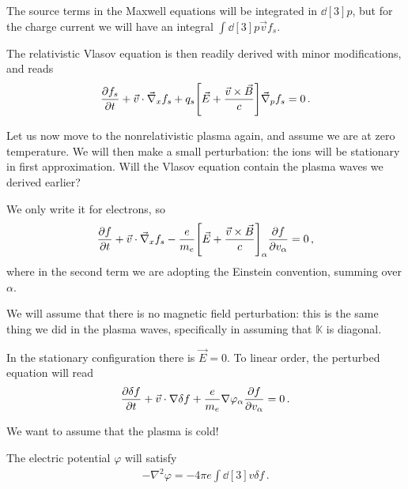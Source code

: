 \documentclass[main.tex]{subfiles}
\begin{document}
The source terms in the Maxwell equations will be integrated in \(\dd[3]{p}\), but for the charge current we will have an integral \(\int \dd[3]{p} \vec{v} f_s\). 

The relativistic Vlasov equation is then readily derived with minor modifications, and reads 
%
\begin{align}
\pdv{f_s}{t} + \vec{v} \cdot \vec{\nabla}_x f_s + q_s \qty[ \vec{E} + \frac{\vec{v} \times \vec{B}}{c}] \vec{\nabla}_p f_s = 0 
\,.
\end{align}

Let us now move to the nonrelativistic plasma again, and assume we are at zero temperature. 
We will then make a small perturbation: the ions will be stationary in first approximation. 
Will the Vlasov equation contain the plasma waves we derived earlier? 

We only write it for electrons, so 
%
\begin{align}
\pdv{f}{t} + \vec{v} \cdot \vec{\nabla}_x f_s 
- \frac{e}{m_e} \qty[\vec{E} + \frac{\vec{v} \times \vec{B}}{c}]_\alpha \pdv{f}{v_\alpha } = 0
\,,
\end{align}
%
where in the second term we are adopting the Einstein convention, summing over \(\alpha \). 

We will assume that there is no magnetic field perturbation: this is the same thing we did in the plasma waves, specifically in assuming that \(\mathbb{K}\) is diagonal.


In the stationary configuration there is \(\vec{E} = 0\). 
To linear order, the perturbed equation will read 
%
\begin{align}
\pdv{ \delta f}{t} + \vec{v} \cdot \nabla \delta f + \frac{e}{m_e} \nabla \varphi _\alpha \pdv{f}{v_\alpha } = 0
\,.
\end{align}

We want to assume that the plasma is cold! 

The electric potential \(\varphi \) will satisfy 
%
\begin{align}
- \nabla^2 \varphi = - 4 \pi e \int \dd[3]{v} \delta f
\,.
\end{align}
\end{document}
